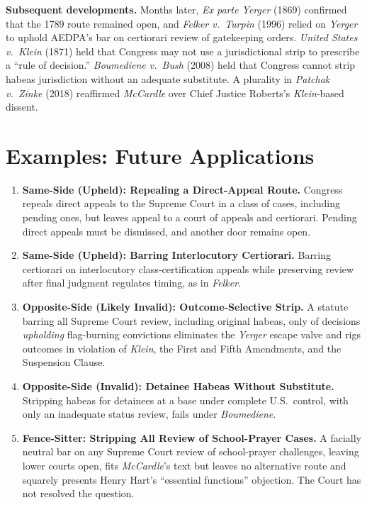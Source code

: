 \documentclass[12pt]{article}
\begin{document}
\textbf{Subsequent developments.} Months later, \textit{Ex parte Yerger} (1869) confirmed that the 1789 route remained open, and \textit{Felker v.\ Turpin} (1996) relied on \textit{Yerger} to uphold AEDPA's bar on certiorari review of gatekeeping orders. \textit{United States v.\ Klein} (1871) held that Congress may not use a jurisdictional strip to prescribe a ``rule of decision.'' \textit{Boumediene v.\ Bush} (2008) held that Congress cannot strip habeas jurisdiction without an adequate substitute. A plurality in \textit{Patchak v.\ Zinke} (2018) reaffirmed \textit{McCardle} over Chief Justice Roberts's \textit{Klein}-based dissent.

\section{Examples: Future Applications}

\begin{enumerate}
\item \textbf{Same-Side (Upheld): Repealing a Direct-Appeal Route.} Congress repeals direct appeals to the Supreme Court in a class of cases, including pending ones, but leaves appeal to a court of appeals and certiorari. Pending direct appeals must be dismissed, and another door remains open.
\item \textbf{Same-Side (Upheld): Barring Interlocutory Certiorari.} Barring certiorari on interlocutory class-certification appeals while preserving review after final judgment regulates timing, as in \textit{Felker}.
\item \textbf{Opposite-Side (Likely Invalid): Outcome-Selective Strip.} A statute barring all Supreme Court review, including original habeas, only of decisions \emph{upholding} flag-burning convictions eliminates the \textit{Yerger} escape valve and rigs outcomes in violation of \textit{Klein}, the First and Fifth Amendments, and the Suspension Clause.
\item \textbf{Opposite-Side (Invalid): Detainee Habeas Without Substitute.} Stripping habeas for detainees at a base under complete U.S.\ control, with only an inadequate status review, fails under \textit{Boumediene}.
\item \textbf{Fence-Sitter: Stripping All Review of School-Prayer Cases.} A facially neutral bar on any Supreme Court review of school-prayer challenges, leaving lower courts open, fits \textit{McCardle}'s text but leaves no alternative route and squarely presents Henry Hart's ``essential functions'' objection. The Court has not resolved the question.
\end{enumerate}
\end{document}
